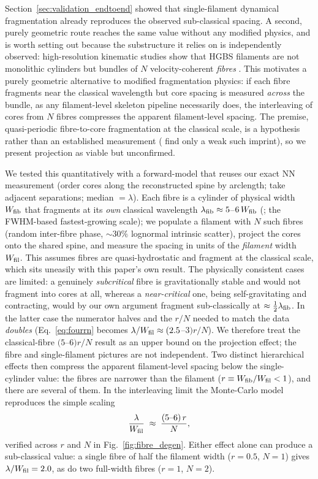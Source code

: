 \documentclass[usenatbib,twoside,twocolumn]{mnras}
\begin{document}
Section~\ref{sec:validation_endtoend} showed that single-filament dynamical fragmentation already reproduces the observed sub-classical spacing. A second, purely geometric route reaches the same value without any modified physics, and is worth setting out because the substructure it relies on is independently observed: high-resolution kinematic studies show that HGBS filaments are not monolithic cylinders but bundles of $N$ velocity-coherent \emph{fibres} \citep{Hacar2013,Hacar2018,Yang2024}. This motivates a purely geometric alternative to modified fragmentation physics: if each fibre fragments near the classical wavelength but core spacing is measured \emph{across} the bundle, as any filament-level skeleton pipeline necessarily does, the interleaving of cores from $N$ fibres compresses the apparent filament-level spacing. The premise, quasi-periodic fibre-to-core fragmentation at the classical scale, is a hypothesis rather than an established measurement (\citealt{Yang2024} find only a weak such imprint), so we present projection as viable but unconfirmed.

We tested this quantitatively with a forward-model that reuses our exact NN measurement (order cores along the reconstructed spine by arclength; take adjacent separations; median $=\lambda$). Each fibre is a cylinder of physical width $W_{\rm fib}$ that fragments at its \emph{own} classical wavelength $\lambda_{\rm fib}\approx5$--$6\,W_{\rm fib}$ (\citealt{Fischera2012}; the FWHM-based fastest-growing scale); we populate a filament with $N$ such fibres (random inter-fibre phase, $\sim30\%$ lognormal intrinsic scatter), project the cores onto the shared spine, and measure the spacing in units of the \emph{filament} width $W_{\rm fil}$. This assumes fibres are quasi-hydrostatic and fragment at the classical scale, which sits uneasily with this paper's own result. The physically consistent cases are limited: a genuinely \emph{subcritical} fibre is gravitationally stable and would not fragment into cores at all, whereas a \emph{near-critical} one, being self-gravitating and contracting, would by our own argument fragment sub-classically at $\approx\tfrac12\lambda_{\rm fib}$. In the latter case the numerator halves and the $r/N$ needed to match the data \emph{doubles} (Eq.~\ref{eq:fourrn} becomes $\lambda/W_{\rm fil}\approx(2.5$--$3)r/N$). We therefore treat the classical-fibre $(5$--$6)r/N$ result as an upper bound on the projection effect; the fibre and single-filament pictures are not independent. Two distinct hierarchical effects then compress the apparent filament-level spacing below the single-cylinder value: the fibres are narrower than the filament ($r\equiv W_{\rm fib}/W_{\rm fil}<1$), and there are several of them. In the interleaving limit the Monte-Carlo model reproduces the simple scaling
\begin{equation}
\frac{\lambda}{W_{\rm fil}} \;\approx\; \frac{(5\text{--}6)\,r}{N},
\label{eq:fourrn}
\end{equation}
verified across $r$ and $N$ in Fig.~\ref{fig:fibre_degen}. Either effect alone can produce a sub-classical value: a single fibre of half the filament width ($r=0.5$, $N=1$) gives $\lambda/W_{\rm fil}=2.0$, as do two full-width fibres ($r=1$, $N=2$).
\end{document}

